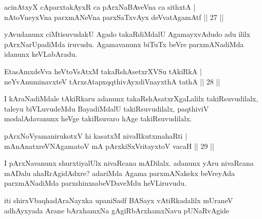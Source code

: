 \begin{shl}
acinAtxyX cAparxtakAyxR ca pArxNaBAveVna ca sithxtA |\\
nAtoV\s neyxVna parxmANeVna parxSaTxvAyx deVvatA\s \s gamAtf \hfill || 27 ||
\end{shl}

\begin{artha}
yAvudanunx ciMtisuvudakU Agado takaRdiMdalU AgamayxvAdudo adu ililx pArxNarUpadiMda iruvudu. Agamavanunx biTuTx beVre parxmANadiMda idanunx keVLabAradu.
\end{artha}

\begin{shl}
EtasAmxdeVva heVtoVsAtxM takaRshAsetxrXVSu tAkiRkA |\\
neYvAnuminavxteV tArxsAtapxqqthivAyxdiVnayxthA tathA \hfill || 28 ||
\end{shl}

\begin{artha}%
I kAraNadiMdale tAkiRkaru adanunx takaRshAsatxrXgaLalilx takiRsuvudilalx, taleyu biVLuvudeMdu BayadiMdalU takiRsuvudilalx, paqthiviV modalAdavanunx heVge takiRsuvaro hAge takiRsuvudilalx.
\end{artha}

\begin{shl}
pArxNoV\s yamanirukotxV hi kasatxM nivaRkutxmahaRti |\\
mAnAnatxreVNA\s \s gamatoV mA pArxkiSxVritayxtoV vacaH \hfill || 29 ||
\end{shl}

\begin{artha}
I pArxNavanunx shurxtiyalUlx nivaRcana mADilalx. adanunx yAru nivaRcana mADalu ahaRrAgidAdxre? adariMda Agama parxmANakekx beVreyAda parxmANadiMda parxshinxsabeVDaveMdu heVLiruvudu.
\end{artha}

\begin{center}
iti shirxVbaqhadAraNayxka upaniSadf BASayx vAtiRkadalilx mUraneV adhAyxyada Arane bArxhamxNa gAgiRbArxhamxNavu pUNaRvAgide
\end{center}
